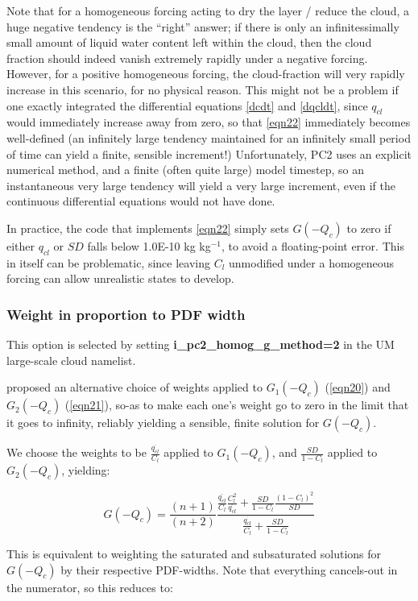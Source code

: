 \documentclass{UMDP_article}
\begin{document}
Note that for a homogeneous forcing acting to dry the layer / reduce
the cloud, a huge negative tendency is the ``right'' answer;
if there is only an infinitessimally small amount of liquid water content
left within the cloud, then the cloud fraction should indeed vanish extremely
rapidly under a negative forcing.
However, for a positive homogeneous forcing, the cloud-fraction will
very rapidly increase in this scenario, for no physical reason.
This might not be a problem if one exactly integrated the differential
equations \ref{dcdt} and \ref{dqcldt}, since $q_{cl}$ would immediately
increase away from zero, so that \ref{eqn22} immediately becomes well-defined
(an infinitely large tendency maintained for an infinitely
small period of time can yield a finite, sensible increment!)
Unfortunately, PC2 uses an explicit numerical method, and a finite (often
quite large) model timestep, so an instantaneous very large tendency
will yield a very large increment, even if the continuous differential
equations would not have done.

In practice, the code that implements \ref{eqn22} simply sets $G(-Q_c)$
to zero if either $q_{cl}$ or $SD$ falls below 1.0E-10 kg kg$^{-1}$,
to avoid a floating-point error.  This in itself can be problematic,
since leaving $C_l$ unmodified under a homogeneous forcing can allow
unrealistic states to develop.

\subsubsection{Weight in proportion to PDF width}

This option is selected by setting \textbf{i\_pc2\_homog\_g\_method=2}
in the UM large-scale cloud namelist.

\cite{morcrette_2020} proposed an alternative choice of weights applied to
$G_1(-Q_c)$ (\ref{eqn20}) and $G_2(-Q_c)$ (\ref{eqn21}), so-as to make each
one's weight go to zero in the limit that it goes to infinity,
reliably yielding a sensible, finite solution for $G(-Q_c)$.

We choose the weights to be $\frac{\overline{q_{cl}}}{C_l}$ applied to
$G_1(-Q_c)$, and $\frac{SD}{1-C_l}$ applied to $G_2(-Q_c)$, yielding:

\[
G(-Q_c) = \frac{(n+1)}{(n+2)} \frac{
     \frac{\overline{q_{cl}}}{C_l} {\frac{C_l^2}{\overline{q_{cl}}}}
  + \frac{SD}{1-C_l} {\frac{{(1-C_l)}^2}{SD}}
          }{ \frac{\overline{q_{cl}}}{C_l} + \frac{SD}{1-C_l} }
\]

This is equivalent to weighting the saturated and subsaturated solutions
for $G(-Q_c)$ by their respective PDF-widths.
Note that everything cancels-out in the numerator, so this reduces to:
\end{document}
